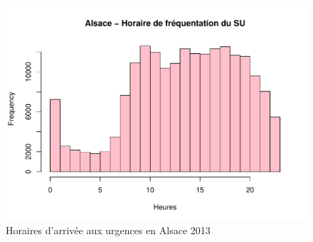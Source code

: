 \documentclass[12pt,english,french,twoside]{report}\usepackage[]{graphicx}\usepackage[]{color}
\makeatletter
\def\maxwidth{ %
  \ifdim\Gin@nat@width>\linewidth
    \linewidth
  \else
    \Gin@nat@width
  \fi
}
\newenvironment{knitrout}{}{} %
\makeatother
\begin{document}
\begin{figure}
\begin{center}
\begin{knitrout}
\color{fgcolor}
\includegraphics[width=\maxwidth]{figure/test23} 

\end{knitrout}

\end{center}
\caption{Horaires d'arrivée aux urgences en Alsace 2013}
\label{passage:als}
\end{figure}
\end{document}
